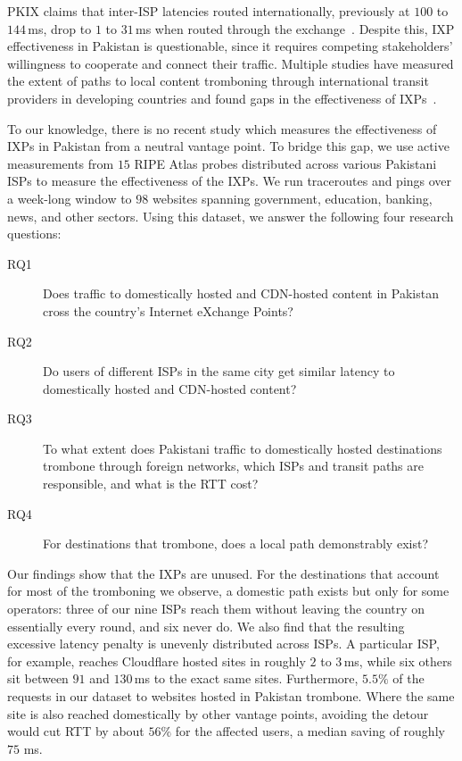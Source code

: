 \documentclass[sigconf,anonymous,10pt]{acmart}
\begin{document}
PKIX claims that inter-ISP latencies routed internationally, previously at $100$ to $144$\,ms, drop to $1$ to $31$\,ms when routed through the exchange~\cite{pta2026}.
Despite this, IXP effectiveness in Pakistan is questionable, since it requires competing stakeholders' willingness to cooperate and connect their traffic.
Multiple studies have measured the extent of paths to local content tromboning through international transit providers in developing countries and found gaps in the effectiveness of IXPs~\cite{gupta2014, edmundson2016characterizing, obriain2017rebuilding}.    

To our knowledge, there is no recent study which measures the effectiveness of IXPs in Pakistan from a neutral vantage point.
To bridge this gap, we use active measurements from $15$ RIPE Atlas probes distributed across various Pakistani ISPs to measure the effectiveness of the IXPs. We run traceroutes and pings over a week-long window to $98$ websites spanning government, education, banking, news, and other sectors.
Using this dataset, we answer the following four research questions:

\begin{description}
  \item[RQ1] Does traffic to domestically hosted and CDN-hosted content in Pakistan cross the country's Internet eXchange Points?
  \item[RQ2] Do users of different ISPs in the same city get similar latency to domestically hosted and CDN-hosted content? 
  \item[RQ3] To what extent does Pakistani traffic to domestically hosted destinations trombone through foreign networks, which ISPs and transit paths are responsible, and what is the RTT cost?
  \item[RQ4] For destinations that trombone, does a local path demonstrably exist?
\end{description}

Our findings show that the IXPs are unused. For the destinations that account for most of the tromboning we observe, a domestic path exists but only for some operators: three of our nine ISPs reach them without leaving the country on essentially every round, and six never do. We also find that the resulting excessive latency penalty is unevenly distributed across ISPs. A particular ISP, for example, reaches Cloudflare hosted sites in roughly $2$ to $3$\,ms, while six others sit between $91$ and $130$\,ms to the exact same sites. Furthermore, $5.5\%$ of the requests in our dataset to websites hosted in Pakistan trombone. Where the same site is also reached domestically by other vantage points, avoiding the detour would cut RTT by about $56\%$ for the affected users, a median saving of roughly $75$ ms.
\end{document}
